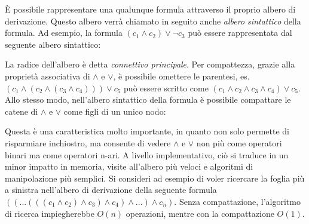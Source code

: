 \documentclass[./main.tex]{subfiles}
\begin{document}
È possibile rappresentare una qualunque formula attraverso il proprio albero di derivazione. Questo albero 
verrà chiamato in seguito anche \textit{albero sintattico} della formula. Ad esempio, la formula 
$(c_1 \land c_2) \lor \lnot c_3$ può essere rappresentata dal seguente albero sintattico:

\begin{center}
\end{center}


La radice dell'albero è detta \textit{connettivo principale}. Per compattezza, grazie alla proprietà associativa di $\land$ e $\lor$, è possibile omettere le parentesi, es. 
$(c_1 \land (c_2 \land (c_3 \land c_4))) \lor c_5$ può essere scritto come $(c_1 \land c_2 \land c_3 \land c_4) \lor c_5$. 
Allo stesso modo, nell'albero sintattico della formula è possibile compattare le catene di $\land$ e $\lor$ come figli di un unico nodo:

\begin{center}
\end{center}

Questa è una caratteristica molto importante, in quanto non solo permette di risparmiare inchiostro, ma consente di vedere
$\land$ e $\lor$ non più come operatori binari ma come operatori n-ari. A livello implementativo, ciò si traduce in un minor
impatto in memoria, visite all'albero più veloci e algoritmi di manipolazione più semplici. Si consideri ad esempio di voler ricercare la 
foglia più a sinistra nell'albero di derivazione della seguente formula $(( ... (((c_1 \land c_2) \land c_3) \land c_4) \land ... )\land c_n)$.
Senza compattazione, l'algoritmo di ricerca impiegherebbe $O(n)$ operazioni, mentre con la compattazione $O(1)$.
\end{document}
